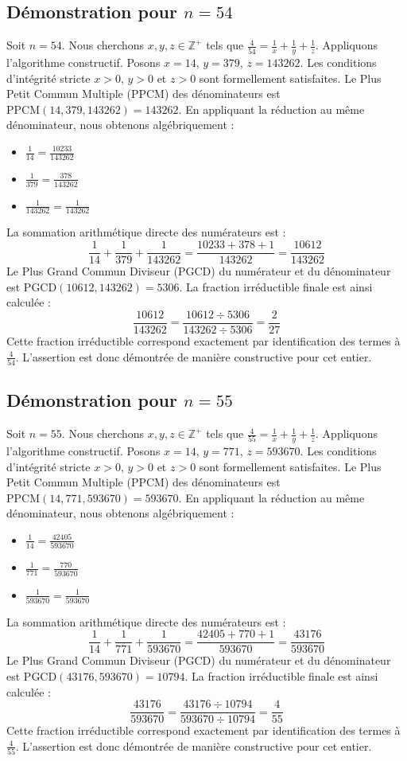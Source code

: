 \documentclass[11pt,a4paper]{article}
\begin{document}
\subsection{Démonstration pour $n = 54$}
Soit $n = 54$. Nous cherchons $x, y, z \in \mathbb{Z}^{+}$ tels que $\frac{4}{54} = \frac{1}{x} + \frac{1}{y} + \frac{1}{z}$.
Appliquons l'algorithme constructif. Posons $x = 14$, $y = 379$, $z = 143262$.
Les conditions d'intégrité stricte $x > 0$, $y > 0$ et $z > 0$ sont formellement satisfaites.
Le Plus Petit Commun Multiple (PPCM) des dénominateurs est $\text{PPCM}(14, 379, 143262) = 143262$.
En appliquant la réduction au même dénominateur, nous obtenons algébriquement :
\begin{itemize}
    \item $\frac{1}{14} = \frac{10233}{143262}$
    \item $\frac{1}{379} = \frac{378}{143262}$
    \item $\frac{1}{143262} = \frac{1}{143262}$
\end{itemize}
La sommation arithmétique directe des numérateurs est :
$$ \frac{1}{14} + \frac{1}{379} + \frac{1}{143262} = \frac{10233 + 378 + 1}{143262} = \frac{10612}{143262} $$
Le Plus Grand Commun Diviseur (PGCD) du numérateur et du dénominateur est $\text{PGCD}(10612, 143262) = 5306$.
La fraction irréductible finale est ainsi calculée :
$$ \frac{10612}{143262} = \frac{10612 \div 5306}{143262 \div 5306} = \frac{2}{27} $$
Cette fraction irréductible correspond exactement par identification des termes à $\frac{4}{54}$. L'assertion est donc démontrée de manière constructive pour cet entier.

\subsection{Démonstration pour $n = 55$}
Soit $n = 55$. Nous cherchons $x, y, z \in \mathbb{Z}^{+}$ tels que $\frac{4}{55} = \frac{1}{x} + \frac{1}{y} + \frac{1}{z}$.
Appliquons l'algorithme constructif. Posons $x = 14$, $y = 771$, $z = 593670$.
Les conditions d'intégrité stricte $x > 0$, $y > 0$ et $z > 0$ sont formellement satisfaites.
Le Plus Petit Commun Multiple (PPCM) des dénominateurs est $\text{PPCM}(14, 771, 593670) = 593670$.
En appliquant la réduction au même dénominateur, nous obtenons algébriquement :
\begin{itemize}
    \item $\frac{1}{14} = \frac{42405}{593670}$
    \item $\frac{1}{771} = \frac{770}{593670}$
    \item $\frac{1}{593670} = \frac{1}{593670}$
\end{itemize}
La sommation arithmétique directe des numérateurs est :
$$ \frac{1}{14} + \frac{1}{771} + \frac{1}{593670} = \frac{42405 + 770 + 1}{593670} = \frac{43176}{593670} $$
Le Plus Grand Commun Diviseur (PGCD) du numérateur et du dénominateur est $\text{PGCD}(43176, 593670) = 10794$.
La fraction irréductible finale est ainsi calculée :
$$ \frac{43176}{593670} = \frac{43176 \div 10794}{593670 \div 10794} = \frac{4}{55} $$
Cette fraction irréductible correspond exactement par identification des termes à $\frac{4}{55}$. L'assertion est donc démontrée de manière constructive pour cet entier.
\end{document}
